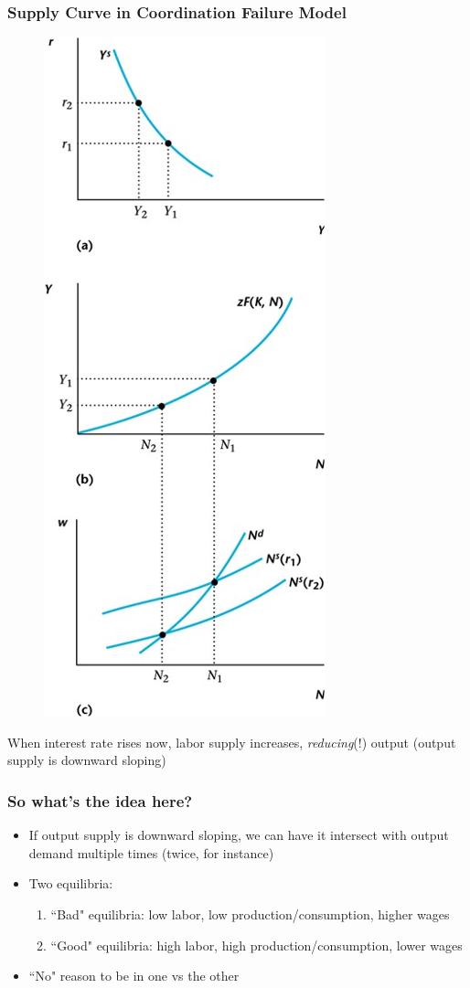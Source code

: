 \documentclass{beamer}
\begin{document}
\begin{frame}
\frametitle[alignment=center]{Supply Curve in Coordination Failure Model}
\begin{figure}
\centering
\includegraphics[scale=0.55]{Figures/W_Fig_13pt8.png}
\end{figure}
When interest rate rises now, labor supply increases, \emph{reducing}(!) output (output supply is downward sloping)
\end{frame}

\begin{frame}
\frametitle[alignment=center]{So what's the idea here?}
\begin{itemize}
\item If output supply is downward sloping, we can have it intersect with output demand multiple times (twice, for instance)
\bigskip
\item Two equilibria: 
\begin{enumerate}
\item ``Bad" equilibria: low labor, low production/consumption, higher wages
\bigskip
\item ``Good" equilibria: high labor, high production/consumption, lower wages
\end{enumerate}
\item ``No" reason to be in one vs the other
\end{itemize}
\end{frame}
\end{document}
